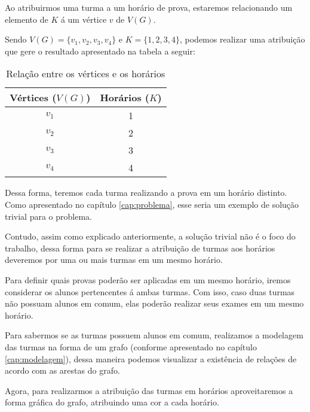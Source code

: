 Ao atribuirmos uma turma a um horário de prova, estaremos relacionando um elemento de $K$ á um vértice $v$ de $V(G)$.

Sendo $V(G) = \{v_1, v_2, v_3, v_4\}$ e $K = \{1, 2, 3, 4\}$, podemos realizar uma atribuição que gere o resultado apresentado na tabela a seguir:

\begin{table}[H]
    \centering
    \vspace{0.5cm}
    \renewcommand\arraystretch{1.5}
    \begin{tabular}{c|c}
     
        \textbf{Vértices ($V(G)$)} & \textbf{Horários ($K$)} \\ %
        \hline                               %
        	$v_1$ & 1 \\
$v_2$ & 2 \\
$v_3$ & 3 \\
$v_4$ & 4      %
        \\
        \hline
    \end{tabular}
    \caption{Relação entre os vértices e os horários}
    \label{tabela-relacao1}
\end{table}




Dessa forma, teremos cada turma realizando a prova em um horário distinto. Como apresentado no capítulo \ref{cap:problema}, esse seria um exemplo de solução trivial para o problema.

Contudo, assim como explicado anteriormente, a solução trivial não é o foco do trabalho, dessa forma para se realizar a atribuição de turmas aos horários deveremos por uma ou mais turmas em um mesmo horário. 

Para definir quais provas poderão ser aplicadas em um mesmo horário, iremos considerar os alunos pertencentes á ambas turmas. Com isso, caso duas turmas não possuam alunos em comum, elas poderão realizar seus exames em um mesmo horário.

Para sabermos se as turmas possuem alunos em comum, realizamos a modelagem das turmas na forma de um grafo (conforme apresentado no capítulo \ref{cap:modelagem}), dessa maneira podemos visualizar a existência de relações de acordo com as arestas do grafo.

Agora, para realizarmos a atribuição das turmas em horários aproveitaremos a forma gráfica do grafo, atribuindo uma cor a cada horário.

